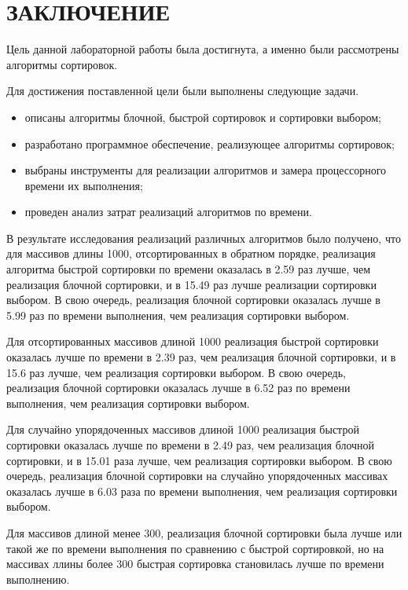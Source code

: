 \chapter*{ЗАКЛЮЧЕНИЕ}

Цель данной лабораторной работы была достигнута, а именно были рассмотрены алгоритмы сортировок.

Для достижения поставленной цели были выполнены следующие задачи.
\begin{itemize}
	\item описаны алгоритмы блочной, быстрой сортировок и сортировки выбором;
	\item разработано программное обеспечение, реализующее алгоритмы сортировок;
	\item выбраны инструменты для реализации алгоритмов и замера процессорного времени их выполнения;
	\item проведен анализ затрат реализаций алгоритмов по времени. 
\end{itemize}

В результате исследования реализаций различных алгоритмов было получено, что для массивов длины 1000, отсортированных в обратном порядке, реализация алгоритма быстрой сортировки по времени оказалась в 2.59 раз лучше, чем реализация блочной сортировки, и в 15.49 раз лучше реализации сортировки выбором.
В свою очередь, реализация блочной сортировки оказалась лучше в 5.99 раз по времени выполнения, чем реализация  сортировки выбором.

Для отсортированных массивов длиной 1000 реализация быстрой сортировки оказалась лучше по времени в 2.39 раз, чем реализация блочной сортировки, и в 15.6 раз лучше, чем реализация сортировки выбором. 
В свою очередь, реализация блочной сортировки оказалась лучше в 6.52 раз по времени выполнения, чем реализация сортировки выбором.

Для случайно упорядоченных массивов длиной 1000 реализация быстрой сортировки оказалась лучше по времени в 2.49 раз, чем реализация блочной сортировки, и в 15.01 раза лучше, чем реализация сортировки выбором. 
В свою очередь, реализация блочной сортировки на случайно упорядоченных массивах оказалась лучше в 6.03 раза по времени выполнения, чем реализация сортировки выбором.

Для массивов длиной менее 300, реализация блочной сортировки была лучше или такой же по времени выполнения по сравнению с быстрой сортировкой, но на массивах ллины более 300 быстрая сортировка становилась лучше по времени выполнению.
